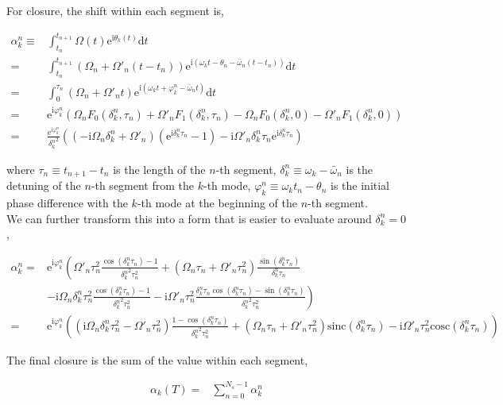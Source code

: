 \documentclass[10pt,fleqn]{article}
\newcommand{\ud}{\mathrm{d}}
\newcommand{\ue}{\mathrm{e}}
\newcommand{\ui}{\mathrm{i}}
\newcommand{\eqar}[1]
{
  \begin{align*}
    #1
  \end{align*}
}
\newcommand{\paren}[1]{{\left({#1}\right)}}
\newcommand{\lparen}[1]{{\left({#1}\right.}}
\newcommand{\rparen}[1]{{\left.{#1}\right)}}
\begin{document}
For closure, the shift within each segment is,
\eqar{
  \alpha_k^n\equiv&\int_{t_n}^{t_{n+1}}\Omega(t)\ue^{\ui\theta_k(t)}\ud t\\
  =&\int_{t_n}^{t_{n+1}}\paren{\Omega_n+\Omega'_n\paren{t-t_n}}\ue^{\ui\paren{\omega_kt-\theta_n-\bar\omega_n\paren{t-t_n}}}\ud t\\
  =&\int_{0}^{\tau_n}\paren{\Omega_n+\Omega'_n t}\ue^{\ui\paren{\omega_kt+\varphi_k^n-\bar\omega_n t}}\ud t\\
  =&\ue^{\ui\varphi_k^n}\paren{\Omega_nF_0(\delta_k^n, \tau_n)+\Omega'_nF_1(\delta_k^n, \tau_n)-\Omega_nF_0(\delta_k^n, 0)-\Omega'_nF_1(\delta_k^n, 0)}\\
  =&\frac{\ue^{\ui\varphi_k^n}}{{\delta_k^n}^2}\paren{
    \paren{-\ui\Omega_n\delta_k^n+\Omega'_n}\paren{\ue^{\ui\delta_k^n\tau_n}-1}
    -\ui\Omega'_n\delta_k^n\tau_n\ue^{\ui\delta_k^n\tau_n}}
}
where $\tau_n\equiv t_{n+1}-t_n$ is the length of the $n$-th segment, $\delta_k^n\equiv\omega_k-\bar\omega_n$ is the detuning of the $n$-th segment from the $k$-th mode, $\varphi_k^n\equiv\omega_kt_n-\theta_n$ is the initial phase difference with the $k$-th mode at the beginning of the $n$-th segment.\\

We can further transform this into a form that is easier to evaluate
around $\delta_k^n=0$,
\eqar{
  \alpha_k^n=&\ue^{\ui\varphi_k^n}\lparen{
    \Omega'_n\tau_n^2\frac{\cos\paren{\delta_k^n\tau_n}-1}{{\delta_k^n}^2\tau_n^2}
    +\paren{\Omega_n\tau_n+\Omega'_n\tau_n^2}\frac{\sin\paren{\delta_k^n\tau_n}}{\delta_k^n\tau_n}
  }\\
  &\rparen{
    -\ui\Omega_n\delta_k^n\tau_n^2\frac{\cos\paren{\delta_k^n\tau_n}-1}{{\delta_k^n}^2\tau_n^2}
    -\ui\Omega'_n\tau_n^2\frac{\delta_k^n\tau_n\cos\paren{\delta_k^n\tau_n}-\sin\paren{\delta_k^n\tau_n}}{{\delta_k^n}^2\tau_n^2}
  }\\
  =&\ue^{\ui\varphi_k^n}\paren{
    \paren{\ui\Omega_n\delta_k^n\tau_n^2-\Omega'_n\tau_n^2}\frac{1-\cos\paren{\delta_k^n\tau_n}}{{\delta_k^n}^2\tau_n^2}
    +\paren{\Omega_n\tau_n+\Omega'_n\tau_n^2}\mathrm{sinc}\paren{\delta_k^n\tau_n}
    -\ui\Omega'_n\tau_n^2\mathrm{cosc}\paren{\delta_k^n\tau_n}
  }
}

The final closure is the sum of the value within each segment,
\eqar{
  \alpha_k(T)=&\sum_{n=0}^{N_s-1}\alpha_k^n
}
\end{document}

